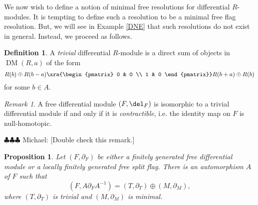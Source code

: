 \documentclass[12pt]{amsart}
\newtheorem{prop}[lemma]{Proposition}
\theoremstyle{definition}
\newtheorem{defn}[lemma]{Definition}
\theoremstyle{remark}
\newtheorem{rem}[lemma]{Remark}
\newcommand{\michael}[1]{{\color{red} \sf $\clubsuit\clubsuit\clubsuit$ Michael: [#1]}}
\def\DM{\operatorname{DM}}
\begin{document}
We now wish to define a notion of minimal free resolutions for differential $R$-modules. It is tempting to define such a resolution to be a minimal free flag resolution. But, we will see in Example \ref{DNE} that such resolutions do not exist in general. Instead, we proceed as follows. 

\begin{defn}
A \emph{trivial} differential $R$-module is a direct sum of objects in $\DM(R, a)$ of the form
$$
R(b) \oplus R(b-a) \xra{\begin{pmatrix} 0 & 0 \\ 1 & 0 \end{pmatrix}} R(b+a) \oplus R(b)
$$
for some $b \in A $.
\end{defn}

\begin{rem}
A free differential module $(F, \del_F)$ is isomorphic to a trivial differential module if and only if it is \emph{contractible}, i.e. the identity map on $F$ is null-homotopic. 
\end{rem}
\michael{Double check this remark.}


\begin{prop}
\label{decomp}
Let $(F, \partial_F)$ be either a finitely generated free differential module or a locally finitely generated free split flag. There is an automorphism $A$ of $F$ such that
$$
(F, A\partial_FA^{-1}) =  (T, \partial_T) \oplus (M, \partial_M),
$$
where $(T, \partial_T)$ is trivial and $(M, \partial_M)$ is minimal.
\end{prop}
\end{document}
